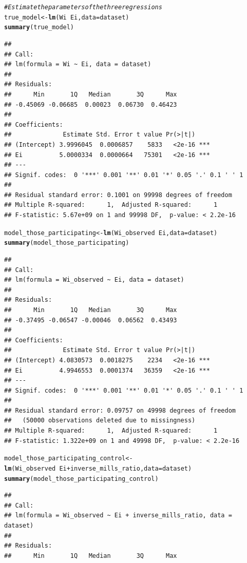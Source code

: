 \documentclass{article}\usepackage[]{graphicx}\usepackage[]{xcolor}
\makeatletter
\newcommand{\hlcom}[1]{\textcolor[rgb]{0.678,0.584,0.686}{\textit{#1}}}%
\newcommand{\hlopt}[1]{\textcolor[rgb]{0,0,0}{#1}}%
\newcommand{\hldef}[1]{\textcolor[rgb]{0.345,0.345,0.345}{#1}}%
\newcommand{\hlkwb}[1]{\textcolor[rgb]{0.69,0.353,0.396}{#1}}%
\newcommand{\hlkwc}[1]{\textcolor[rgb]{0.333,0.667,0.333}{#1}}%
\newcommand{\hlkwd}[1]{\textcolor[rgb]{0.737,0.353,0.396}{\textbf{#1}}}%
\newenvironment{kframe}{%
 \def\at@end@of@kframe{}%
 \ifinner\ifhmode%
  \def\at@end@of@kframe{\end{minipage}}%
  \begin{minipage}{\columnwidth}%
 \fi\fi%
 \def\FrameCommand##1{\hskip\@totalleftmargin \hskip-\fboxsep
 \colorbox{shadecolor}{##1}\hskip-\fboxsep
     \hskip-\linewidth \hskip-\@totalleftmargin \hskip\columnwidth}%
 \MakeFramed {\advance\hsize-\width
   \@totalleftmargin\z@ \linewidth\hsize
   \@setminipage}}%
 {\par\unskip\endMakeFramed%
 \at@end@of@kframe}
\newenvironment{knitrout}{}{} %
\makeatother
\begin{document}
\begin{knitrout}
\begin{kframe}
\begin{alltt}
\hlcom{# Estimate the parameters of the three regressions}
\hldef{true_model} \hlkwb{<-} \hlkwd{lm}\hldef{(Wi}\hlopt{~}\hldef{Ei,} \hlkwc{data}\hldef{=dataset)}
\hlkwd{summary}\hldef{(true_model)}
\end{alltt}
\begin{verbatim}
## 
## Call:
## lm(formula = Wi ~ Ei, data = dataset)
## 
## Residuals:
##      Min       1Q   Median       3Q      Max 
## -0.45069 -0.06685  0.00023  0.06730  0.46423 
## 
## Coefficients:
##              Estimate Std. Error t value Pr(>|t|)    
## (Intercept) 3.9996045  0.0006857    5833   <2e-16 ***
## Ei          5.0000334  0.0000664   75301   <2e-16 ***
## ---
## Signif. codes:  0 '***' 0.001 '**' 0.01 '*' 0.05 '.' 0.1 ' ' 1
## 
## Residual standard error: 0.1001 on 99998 degrees of freedom
## Multiple R-squared:      1,	Adjusted R-squared:      1 
## F-statistic: 5.67e+09 on 1 and 99998 DF,  p-value: < 2.2e-16
\end{verbatim}
\begin{alltt}
\hldef{model_those_participating} \hlkwb{<-} \hlkwd{lm}\hldef{(Wi_observed}\hlopt{~}\hldef{Ei,} \hlkwc{data}\hldef{=dataset)}
\hlkwd{summary}\hldef{(model_those_participating)}
\end{alltt}
\begin{verbatim}
## 
## Call:
## lm(formula = Wi_observed ~ Ei, data = dataset)
## 
## Residuals:
##      Min       1Q   Median       3Q      Max 
## -0.37495 -0.06547 -0.00046  0.06562  0.43493 
## 
## Coefficients:
##              Estimate Std. Error t value Pr(>|t|)    
## (Intercept) 4.0830573  0.0018275    2234   <2e-16 ***
## Ei          4.9946553  0.0001374   36359   <2e-16 ***
## ---
## Signif. codes:  0 '***' 0.001 '**' 0.01 '*' 0.05 '.' 0.1 ' ' 1
## 
## Residual standard error: 0.09757 on 49998 degrees of freedom
##   (50000 observations deleted due to missingness)
## Multiple R-squared:      1,	Adjusted R-squared:      1 
## F-statistic: 1.322e+09 on 1 and 49998 DF,  p-value: < 2.2e-16
\end{verbatim}
\begin{alltt}
\hldef{model_those_participating_control} \hlkwb{<-} \hlkwd{lm}\hldef{(Wi_observed}\hlopt{~}\hldef{Ei}\hlopt{+}\hldef{inverse_mills_ratio,} \hlkwc{data}\hldef{=dataset)}
\hlkwd{summary}\hldef{(model_those_participating_control)}
\end{alltt}
\begin{verbatim}
## 
## Call:
## lm(formula = Wi_observed ~ Ei + inverse_mills_ratio, data = dataset)
## 
## Residuals:
##      Min       1Q   Median       3Q      Max 

\end{verbatim}
\end{kframe}
\end{knitrout}
\end{document}
